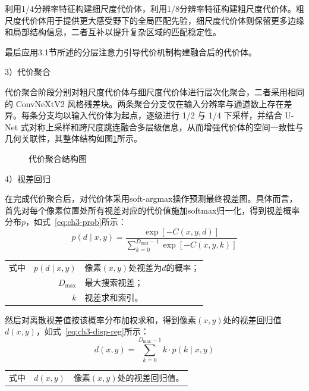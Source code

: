 利用1/4分辨率特征构建细尺度代价体，利用1/8分辨率特征构建粗尺度代价体。粗尺度代价体用于提供更大感受野下的全局匹配先验，细尺度代价体则保留更多边缘和局部结构信息，二者互补以提升复杂区域的匹配稳定性。

最后应用3.1节所述的分层注意力引导代价机制构建融合后的代价体。

3）代价聚合

代价聚合阶段分别对粗尺度代价体与细尺度代价体进行层次化聚合，二者采用相同的 ConvNeXtV2 风格残差块。两条聚合分支仅在输入分辨率与通道数上存在差异。每条分支均以输入代价体为起点，逐级进行 1/2 与 1/4 下采样，并结合 U-Net 式对称上采样和跨尺度跳连融合多层级信息，从而增强代价体的空间一致性与几何关联性，其整体结构如图\ref{代价聚合结构图}所示。

\begin{figure}[h]
  \centering
  
  \caption{代价聚合结构图}
  \label{代价聚合结构图}
\end{figure}

4）视差回归

在完成代价聚合后，对代价体采用soft-argmax操作预测最终视差图。具体而言，首先对每个像素位置处所有视差对应的代价值施加softmax归一化，得到视差概率分布$p$，如式~\eqref{eq:ch3-prob}所示：
\begin{equation}\label{eq:ch3-prob}
p(d\mid x,y)=\frac{\exp[-C(x,y,d)]}{\sum_{k=0}^{D_{\max}-1}\exp[-C(x,y,k)]}
\end{equation}
\begin{tabularx}{\textwidth}{@{}l@{\quad}r@{———}X@{}}
式中& $p(d\mid x,y)$ & 像素$(x,y)$处视差为$d$的概率；\\
& $D_{\max}$ & 最大搜索视差；\\
& $k$ & 视差求和索引。\\
\end{tabularx}\vspace{3.15bp}

然后对离散视差值按该概率分布加权求和，得到像素$(x,y)$处的视差回归值$d(x,y)$，如式~\eqref{eq:ch3-disp-reg}所示：
\begin{equation}\label{eq:ch3-disp-reg}
d(x,y)=\sum_{k=0}^{D_{\max}-1} k\cdot p(k\mid x,y)
\end{equation}
\begin{tabularx}{\textwidth}{@{}l@{\quad}r@{———}X@{}}
式中& $d(x,y)$ & 像素$(x,y)$处的视差回归值。\\
\end{tabularx}\vspace{3.15bp}

